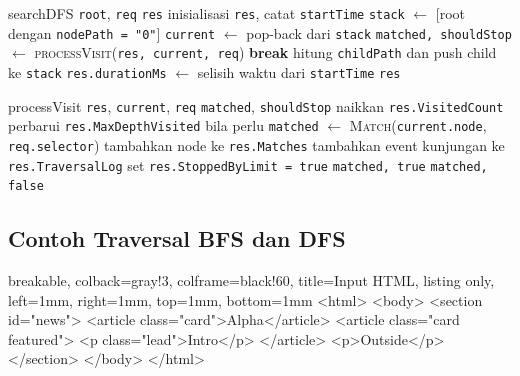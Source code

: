 \begin{ieeealgorithm}{searchDFS}
    \Require \texttt{root}, \texttt{req}
    \Ensure \texttt{res}
    \State inisialisasi \texttt{res}, catat \texttt{startTime}
    \State \texttt{stack} $\gets$ [root dengan \texttt{nodePath = "0"}]
    \State \texttt{current} $\gets$ pop-back dari \texttt{stack}
    \State \texttt{matched, shouldStop} $\gets$ \textsc{processVisit}(\texttt{res, current, req})
    \State \textbf{break}
    \EndIf
    \State hitung \texttt{childPath} dan push child ke \texttt{stack}
    \EndFor
    \EndWhile
    \State \texttt{res.durationMs} $\gets$ selisih waktu dari \texttt{startTime}
    \State \Return \texttt{res}
\end{ieeealgorithm}

\begin{ieeealgorithm}{processVisit}
    \Require \texttt{res}, \texttt{current}, \texttt{req}
    \Ensure \texttt{matched}, \texttt{shouldStop}
    \State naikkan \texttt{res.VisitedCount}
    \State perbarui \texttt{res.MaxDepthVisited} bila perlu
    \State \texttt{matched} $\gets$ \textsc{Match}(\texttt{current.node}, \texttt{req.selector})
    \State tambahkan node ke \texttt{res.Matches}
    \EndIf
    \State tambahkan event kunjungan ke \texttt{res.TraversalLog}
    \EndIf
    \State set \texttt{res.StoppedByLimit = true}
    \State \Return \texttt{matched, true}
    \EndIf
    \State \Return \texttt{matched, false}
\end{ieeealgorithm}

\subsection{Contoh Traversal BFS dan DFS}

\begin{tcblisting}{
        breakable,
        colback=gray!3,
        colframe=black!60,
        title=Input HTML,
        listing only,
        left=1mm,
        right=1mm,
        top=1mm,
        bottom=1mm
    }
    <html>
    <body>
    <section id="news">
    <article class="card">Alpha</article>
    <article class="card featured">
    <p class="lead">Intro</p>
    </article>
    <p>Outside</p>
    </section>
    </body>
    </html>
\end{tcblisting}

